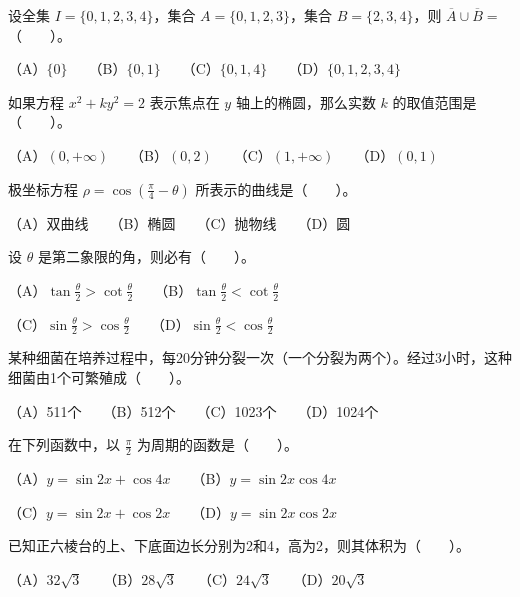 \begin{question}
设全集 $I=\{0,1,2,3,4\}$，集合 $A=\{0,1,2,3\}$，集合 $B=\{2,3,4\}$，则 $\overline{A}\cup\overline{B}=$\mbox{（　　）}。

（A）$\{0\}$　　（B）$\{0,1\}$　　（C）$\{0,1,4\}$　　（D）$\{0,1,2,3,4\}$

\end{question}
\begin{question}
如果方程 $x^2+ky^2=2$ 表示焦点在 $y$ 轴上的椭圆，那么实数 $k$ 的取值范围是\mbox{（　　）}。

（A）$(0,+\infty)$　　（B）$(0,2)$　　（C）$(1,+\infty)$　　（D）$(0,1)$

\end{question}
\begin{question}
极坐标方程 $\rho=\cos\left(\frac{\pi}{4}-\theta\right)$ 所表示的曲线是\mbox{（　　）}。

（A）双曲线　　（B）椭圆　　（C）抛物线　　（D）圆

\end{question}
\begin{question}
设 $\theta$ 是第二象限的角，则必有\mbox{（　　）}。

（A）$\tan\frac\theta2>\cot\frac\theta2$　　（B）$\tan\frac\theta2<\cot\frac\theta2$

（C）$\sin\frac\theta2>\cos\frac\theta2$　　（D）$\sin\frac\theta2<\cos\frac\theta2$

\end{question}
\begin{question}
某种细菌在培养过程中，每20分钟分裂一次（一个分裂为两个）。经过3小时，这种细菌由1个可繁殖成\mbox{（　　）}。

（A）511个　　（B）512个　　（C）1023个　　（D）1024个

\end{question}
\begin{question}
在下列函数中，以 $\frac\pi2$ 为周期的函数是\mbox{（　　）}。

（A）$y=\sin2x+\cos4x$　　（B）$y=\sin2x\cos4x$

（C）$y=\sin2x+\cos2x$　　（D）$y=\sin2x\cos2x$

\end{question}
\begin{question}
已知正六棱台的上、下底面边长分别为2和4，高为2，则其体积为\mbox{（　　）}。

（A）$32\sqrt3$　　（B）$28\sqrt3$　　（C）$24\sqrt3$　　（D）$20\sqrt3$

\end{question}
